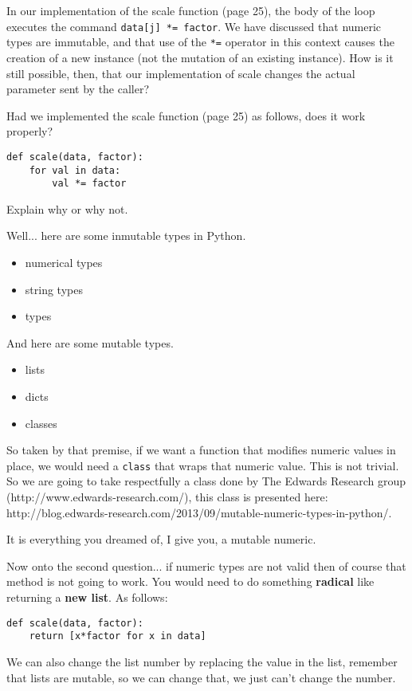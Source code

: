  \label{sssec:ex1_161_17}

In our implementation of the scale function (page 25), the body of the loop executes the command \texttt{data[j] *= factor}. We have discussed that numeric types are immutable, and that use of the \texttt{*=} operator in this context causes the creation of a new instance (not the mutation of an existing instance).
How is it still possible, then, that our implementation of scale changes the actual parameter sent by the caller?

Had we implemented the scale function (page 25) as follows, does it work properly?

\begin{lstlisting}[title=The incorrect\_way]
def scale(data, factor):
	for val in data:
		val *= factor
\end{lstlisting}

Explain why or why not.

Well... here are some inmutable types in Python.

\begin{itemize}
	\item numerical types
	\item string types
	\item types
\end{itemize}

And here are some mutable types.

\begin{itemize}
	\item lists
	\item dicts
	\item classes
\end{itemize}

So taken by that premise, if we want a function that modifies numeric values in place, we would need a \texttt{class} that wraps that numeric value. This is not trivial. So we are going to take respectfully a class done by The Edwards Research group (http://www.edwards-research.com/), this class is presented here: http://blog.edwards-research.com/2013/09/mutable-numeric-types-in-python/.

It is everything you dreamed of, I give you, a mutable numeric. 



Now onto the second question... if numeric types are not valid then of course that method is not going to work. You would need to do something \textbf{radical} like returning a \textbf{new list}. As follows:

\begin{lstlisting}[title=Returning new\_list]
def scale(data, factor):
    return [x*factor for x in data]
\end{lstlisting}

We can also change the list number by replacing the value in the list, remember that lists are mutable, so we can change that, we just can't change the number.



